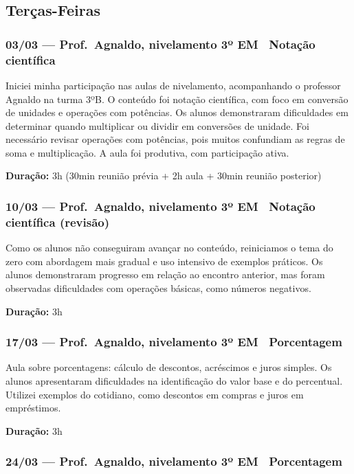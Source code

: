 \documentclass[11pt]{article}
\begin{document}
\subsection*{Terças-Feiras}

\subsubsection*{03/03 --- Prof.\ Agnaldo, nivelamento 3º EM \textbar\ Notação científica}

Iniciei minha participação nas aulas de nivelamento, acompanhando o professor Agnaldo na turma 3ºB. O conteúdo foi notação científica, com foco em conversão de unidades e operações com potências. Os alunos demonstraram dificuldades em determinar quando multiplicar ou dividir em conversões de unidade. Foi necessário revisar operações com potências, pois muitos confundiam as regras de soma e multiplicação. A aula foi produtiva, com participação ativa.

\textbf{Duração:} 3h (30min reunião prévia + 2h aula + 30min reunião posterior)

\subsubsection*{10/03 --- Prof.\ Agnaldo, nivelamento 3º EM \textbar\ Notação científica (revisão)}

Como os alunos não conseguiram avançar no conteúdo, reiniciamos o tema do zero com abordagem mais gradual e uso intensivo de exemplos práticos. Os alunos demonstraram progresso em relação ao encontro anterior, mas foram observadas dificuldades com operações básicas, como números negativos.

\textbf{Duração:} 3h

\subsubsection*{17/03 --- Prof.\ Agnaldo, nivelamento 3º EM \textbar\ Porcentagem}

Aula sobre porcentagens: cálculo de descontos, acréscimos e juros simples. Os alunos apresentaram dificuldades na identificação do valor base e do percentual. Utilizei exemplos do cotidiano, como descontos em compras e juros em empréstimos.

\textbf{Duração:} 3h

\subsubsection*{24/03 --- Prof.\ Agnaldo, nivelamento 3º EM \textbar\ Porcentagem}
\end{document}
